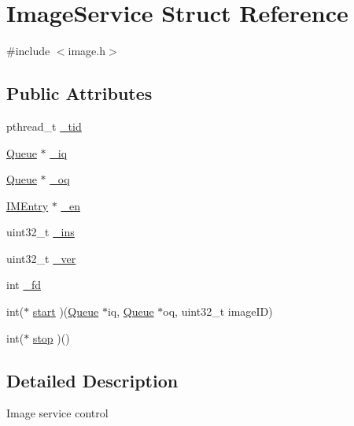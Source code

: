 \hypertarget{structImageService}{\section{\-Image\-Service \-Struct \-Reference}
\label{structImageService}
}


{\ttfamily \#include $<$image.\-h$>$}

\subsection*{\-Public \-Attributes}
\begin{DoxyCompactItemize}
\item 
pthread\-\_\-t \hyperlink{structImageService_a0b31d241acb4668258a642e25ce757f0}{\-\_\-tid}
\item 
\hyperlink{structQueue}{\-Queue} $\ast$ \hyperlink{structImageService_a64bd56a8275013437625425c4dea8b26}{\-\_\-iq}
\item 
\hyperlink{structQueue}{\-Queue} $\ast$ \hyperlink{structImageService_a108f7dbf9ff6ef4af5da79c8a7b4e795}{\-\_\-oq}
\item 
\hyperlink{structIMEntry}{\-I\-M\-Entry} $\ast$ \hyperlink{structImageService_aa81ed60d68af977e73501d0de5cc5fa1}{\-\_\-en}
\item 
uint32\-\_\-t \hyperlink{structImageService_a206c07b8c49b019da7e2f9458a6ce04d}{\-\_\-ins}
\item 
uint32\-\_\-t \hyperlink{structImageService_a2e6bf66e2d6a32fa8f5fa7537baf1f0e}{\-\_\-ver}
\item 
int \hyperlink{structImageService_a5f34b2f826168cd5e135942a2f1b0d00}{\-\_\-fd}
\item 
int($\ast$ \hyperlink{structImageService_a49b4a4d8bc476972045f98f4cfd4f677}{start} )(\hyperlink{structQueue}{\-Queue} $\ast$iq, \hyperlink{structQueue}{\-Queue} $\ast$oq, uint32\-\_\-t image\-I\-D)
\item 
int($\ast$ \hyperlink{structImageService_ae53c4e8e38ce4f9c545d0c0c8cbb22f7}{stop} )()
\end{DoxyCompactItemize}


\subsection{\-Detailed \-Description}
\-Image service control 

